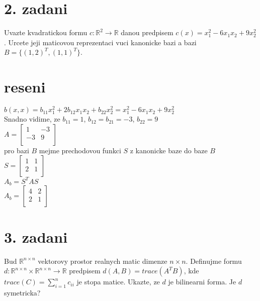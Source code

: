 \documentclass[a4paper]{article}
\def\doubleunderline#1{\underline{\underline{#1}}}
\begin{document}
\section*{2. zadani}
Uvazte kvadratickou formu $c:\mathbb{R}^2\rightarrow\mathbb{R}$
danou predpisem $c(x)=x^2_1-6x_1x_2+9x_2^2$.
Urcete jeji maticovou reprezentaci vuci kanonicke bazi a 
bazi $B=\{(1,2)^T, (1,1)^T\}$.

\section*{reseni}
$
b(x,x) =
b_{11}x_1^2+2b_{12}x_1x_2+b_{22}x_2^2 = 
x^2_1-6x_1x_2+9x_2^2
$\\
Snadno vidime, ze 
$b_{11} = 1$, $b_{12} = b_{21} = -3$, $b_{22} = 9$\\
\doubleunderline{$A=
\begin{bmatrix}
	1&-3\\
	-3&9\\
\end{bmatrix}
$}\\
pro bazi $B$ mejme prechodovou funkci $S$ z kanonicke baze do baze $B$\\
$S = 
\begin{bmatrix}
	1&1\\
	2&1\\
\end{bmatrix}
$\\
$A_b = S^TAS$\\
\doubleunderline{$A_b =
\begin{bmatrix}
	4&2\\
	2&1\\
\end{bmatrix}
$}\\










\section*{3. zadani}
Bud $\mathbb{R}^{n\times n}$ vektorovy prostor realnych matic dimenze $n\times n$.
Definujme formu $d:\mathbb{R}^{n\times n}\times\mathbb{R}^{n\times n}\rightarrow\mathbb{R}$
predpisem $d(A,B) = trace(A^T B)$, kde $trace(C)=\sum^n_{i=1}c_{ii}$
je stopa matice. Ukazte, ze $d$ je bilinearni forma. Je $d$ symetricka?
\end{document}
